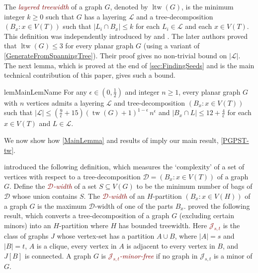 \documentclass[11pt]{article}
\newcommand{\defn}[1]{\textcolor{Maroon}{\emph{#1}}}
\newcommand{\JJ}{\mathcal{J}}
\newcommand{\DD}{\mathcal{D}}
\renewcommand{\geq}{\geqslant}
\renewcommand{\leq}{\leqslant}
\DeclareMathOperator{\ltw}{ltw}
\DeclareMathOperator{\tw}{tw}
\theoremstyle{plain}
\newtheorem{lem}[thm]{Lemma}
\theoremstyle{definition}
\newcommand{\PP}{\mathcal{P}}
\newcommand{\LL}{\mathcal{L}}
\begin{document}
		The \defn{layered treewidth} of a graph $G$, denoted by $\ltw(G)$, is the minimum integer $k\geq 0$ such that $G$ has a layering $\mathcal{L}$ and a tree-decomposition $(B_x:x\in V(T))$ such that $|L_i\cap B_x|\leq k$ for each $L_i\in \mathcal{L}$ and each $x\in V(T)$. This definition was independently introduced by \citet{Shahrokhi13} and \citet{DMW17}. The later authors proved that $\ltw(G)\leq 3$ for every planar graph $G$ (using a variant of \cref{GenerateFromSpanningTree}). Their proof gives no non-trivial bound on $|\mathcal{L}|$. The next lemma, which is proved at the end of \cref{sec:FindingSeeds} and is the main technical contribution of this paper,  gives such a bound. 
		
		\begin{restatable}{lem}{MainLemName}
			\label{MainLemma} 
			For any $\epsilon\in (0,\frac12)$ and integer $n\geq 1$, every planar graph $G$ with $n$ vertices admits a layering $\mathcal{L}$ and tree-decomposition $(B_x:x\in V(T))$ such that $|\mathcal{L}|\leq (\frac{9}{\epsilon}+15) (\tw(G)+1)^{1-\epsilon}\,n^{\epsilon}$ and $|B_x\cap L|\leq 12+\frac{4}{\epsilon}$ for each $x\in V(T)$ and $L\in\LL$.
		\end{restatable}
		
		
		We now show how \cref{MainLemma} and results of \citet{ISW24} imply our main result, \cref{PGPST-tw}. 
		
		\citet{ISW24} introduced the following definition, which measures the `complexity' of a set of vertices with respect to a tree-decomposition $\DD=(B_x:x\in V(T))$ of a graph $G$. Define the \defn{$\DD$-width} of a set $S\subseteq V(G)$ to be the minimum number of bags of $\DD$ whose union contains $S$. 
		The \defn{$\DD$-width} of an $H$-partition $(B_x:x\in V(H))$ of a graph $G$ is the maximum $\DD$-width of one of the parts $B_x$. \citet[Theorem~12]{ISW24}  proved the following result, which converts a tree-decomposition of a graph $G$ (excluding certain minors) into an $H$-partition where $H$ has bounded treewidth. 
		Here \defn{$\JJ_{s, t}$} is the class of graphs $J$ whose vertex-set has a partition $A \cup B$, where $|A| = s$ and $|B| = t$, $A$ is a clique, every vertex in $A$ is adjacent to every vertex in $B$, and $J[B]$ is connected. 
		A graph $G$ is \defn{$\JJ_{s,t}$-minor-free} if no graph in $\JJ_{s,t}$ is a minor of $G$.
		
\end{document}

